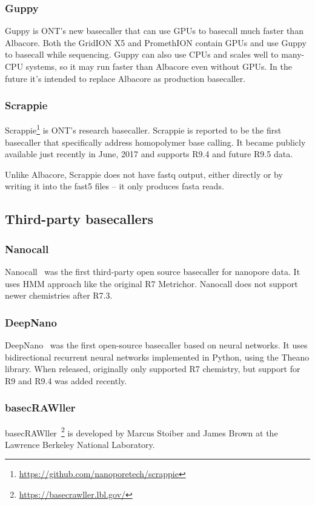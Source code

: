 \documentclass[times, utf8, diplomski, english]{fer}
\begin{document}
\subsubsection{Guppy}
Guppy is ONT's new basecaller that can use GPUs to basecall much faster than Albacore. Both the GridION X5 and PromethION contain GPUs and use Guppy to basecall while sequencing. Guppy can also use CPUs and scales well to many-CPU systems, so it may run faster than Albacore even without GPUs.  In the future it's intended to replace Albacore as production basecaller.
\subsubsection{Scrappie}
Scrappie\footnote{\url{https://github.com/nanoporetech/scrappie}} is ONT's research basecaller. Scrappie is reported to be the first basecaller that specifically address homopolymer base calling. It became publicly available just recently in June, 2017 and supports R9.4 and future R9.5 data.

Unlike Albacore, Scrappie does not have fastq output, either directly or by writing it into the fast5 files – it only produces fasta reads.

\subsection{Third-party basecallers}

\subsubsection{Nanocall}
Nanocall~\citep{David046086} was the first third-party open source basecaller for nanopore data. It uses HMM approach like the original R7 Metrichor. Nanocall does not support newer chemistries after R7.3.

\subsubsection{DeepNano}
DeepNano~\citep{Boza2017}  was the first open-source basecaller based on neural networks. It uses bidirectional recurrent neural networks implemented in Python, using the Theano library. When released, originally only supported R7 chemistry, but support for R9 and R9.4 was added recently.
\subsubsection{basecRAWller}
basecRAWller~\footnote{\url{https://basecrawller.lbl.gov/}} is developed by Marcus Stoiber and James Brown at the Lawrence Berkeley National Laboratory.
\end{document}
